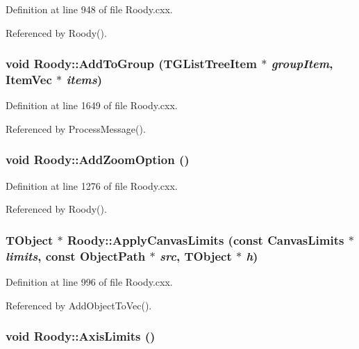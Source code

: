 Definition at line 948 of file Roody.cxx.

Referenced by Roody().
\subsubsection[{AddToGroup}]{\setlength{\rightskip}{0pt plus 5cm}void Roody::AddToGroup (TGListTreeItem $\ast$ {\em groupItem}, \/  {\bf ItemVec} $\ast$ {\em items})\hspace{0.3cm}{\ttfamily  [private]}}\label{classRoody_acf5295deafb4aeae80baab8c08827d3c}


Definition at line 1649 of file Roody.cxx.

Referenced by ProcessMessage().
\subsubsection[{AddZoomOption}]{\setlength{\rightskip}{0pt plus 5cm}void Roody::AddZoomOption ()\hspace{0.3cm}{\ttfamily  [private]}}\label{classRoody_a170d1ee73a2f6dc6ff608e0ad6dbdbb8}


Definition at line 1276 of file Roody.cxx.

Referenced by Roody().
\subsubsection[{ApplyCanvasLimits}]{\setlength{\rightskip}{0pt plus 5cm}TObject $\ast$ Roody::ApplyCanvasLimits (const CanvasLimits $\ast$ {\em limits}, \/  const ObjectPath $\ast$ {\em src}, \/  TObject $\ast$ {\em h})\hspace{0.3cm}{\ttfamily  [private]}}\label{classRoody_a6e3d9ef23ad83cced4999f9437f0089a}


Definition at line 996 of file Roody.cxx.

Referenced by AddObjectToVec().
\subsubsection[{AxisLimits}]{\setlength{\rightskip}{0pt plus 5cm}void Roody::AxisLimits ()}\label{classRoody_a7810450b0a158b92099cfa84edf52dc5}


